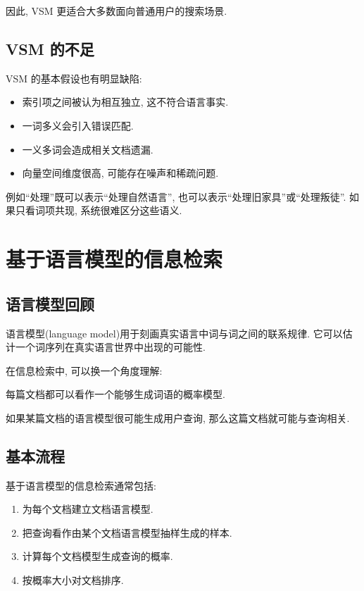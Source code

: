 因此, VSM 更适合大多数面向普通用户的搜索场景.

\subsection{VSM 的不足}


VSM 的基本假设也有明显缺陷:

\begin{itemize}
\item 索引项之间被认为相互独立, 这不符合语言事实.
\item 一词多义会引入错误匹配.
\item 一义多词会造成相关文档遗漏.
\item 向量空间维度很高, 可能存在噪声和稀疏问题.
\end{itemize}

例如“处理”既可以表示“处理自然语言”, 也可以表示“处理旧家具”或“处理叛徒”.
如果只看词项共现, 系统很难区分这些语义.

\section{基于语言模型的信息检索}


\subsection{语言模型回顾}


语言模型(language model)用于刻画真实语言中词与词之间的联系规律.
它可以估计一个词序列在真实语言世界中出现的可能性.

在信息检索中, 可以换一个角度理解:

每篇文档都可以看作一个能够生成词语的概率模型.

如果某篇文档的语言模型很可能生成用户查询,
那么这篇文档就可能与查询相关.

\subsection{基本流程}


基于语言模型的信息检索通常包括:

\begin{enumerate}
\item[1.] 为每个文档建立文档语言模型.
\item[2.] 把查询看作由某个文档语言模型抽样生成的样本.
\item[3.] 计算每个文档模型生成查询的概率.
\item[4.] 按概率大小对文档排序.
\end{enumerate}

